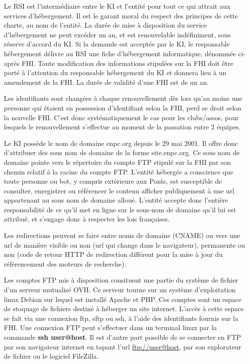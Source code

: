 \documentclass{ki019}
\begin{document}
Le RSI est l'intermédiaire entre le KI et l'entité pour tout ce qui attrait aux services d'hébergement. Il est le garant moral du respect des principes de cette charte, au nom de l'entité. La durée de mise à disposition du service d'hébergement ne peut excéder un an, et est renouvelable indéfiniment, sous réserve d'accord du KI.
Si la demande est acceptée par le KI, le responsable hébergement délivre au RSI une fiche d'hébergement informatique, dénommée ci-après FHI. Toute modification des informations stipulées sur la FHI doit être porté à l'attention du responsable hébergement du KI et donnera lieu à un amendement de la FHI. La durée de validité d'une FHI est de un an.


Les identifiants sont changées à chaque renouvellement dès lors qu'au moins une personne qui étaient en possession d'identifiant selon la FHI, perd se droit selon la nouvelle FHI. C'est donc systématiquement le cas pour les clubs/assos, pour lesquels le renouvellement s'effectue au moment de la passation entre 2 équipes.


Le KI possède le nom de domaine enpc.org depuis le 29 mai 2001. Il offre donc d'attribuer des sous nom de domaine de la forme site.enpc.org. Ce sous nom de domaine pointe vers le répertoire du compte FTP stipulé sur la FHI par son chemin relatif à la racine du compte FTP.
L'entité hébergée a conscience que toute personne ou bot, y compris extérieure aux Ponts, est susceptible de consulter, enregistrer ou référencer le contenu afficher publiquement à une url appartenant au sous nom de domaine alloué. L'entité accepte donc l'entière responsabilité de ce qu'il met en ligne sur le sous-nom de domaine qu'il lui est attribué, et s'engage donc à respecter les lois françaises.

Les redirections peuvent se faire entre noms de domaine (CNAME) ou vers une url de manière visible ou non (url qui change dans le navigateur), permanente ou non (code de retour HTTP de redirection différent pour la mise à jour du référencement des moteurs de recherche).


Les comptes FTP mis à disposition consituent une partie du système de fichier d'un serveur mutualisé OVH. Ce serveur tourne sur un système d'exploitation linux Debian sur lequel est installé Apache et PHP. Ces comptes sont un espace de stoquage de fichiers destiné à héberger un site internet. L'accès à cette espace se fait via une connexion ftp, sftp ou ssh, à l'aide des identifiants fournis sur la FHI. Une connexion FTP peut s'effectuer dans un terminal linux par la commande \textbf{ssh user@host}. Il est d'autre part possible de se connecter en FTP par son navigateur internet en tapant l'url \url{ftp://user@host}, par son explorateur de fichier ou le logiciel FileZilla.
\end{document}
